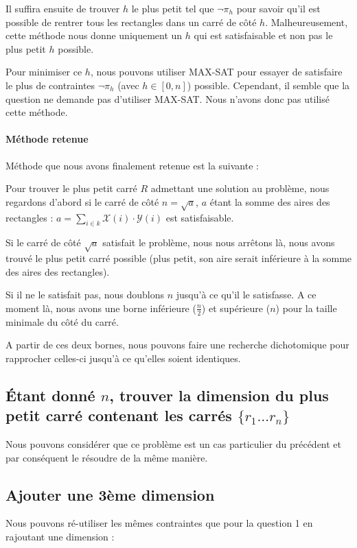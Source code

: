 \documentclass[a4paper]{article}
\begin{document}
Il suffira ensuite de trouver $h$ le plus petit tel que $\lnot \pi_{h}$ pour savoir qu'il est possible de rentrer tous les rectangles dans un carré de côté $h$. Malheureusement, cette méthode nous donne uniquement un $h$ qui est satisfaisable et non pas le plus petit $h$ possible.

Pour minimiser ce $h$, nous pouvons utiliser MAX-SAT pour essayer de satisfaire le plus de contraintes $\lnot \pi_h$ (avec $h \in [0, n]$) possible. Cependant, il semble que la question ne demande pas d'utiliser MAX-SAT. Nous n'avons donc pas utilisé cette méthode.

\paragraph{Méthode retenue} Méthode que nous avons finalement retenue est la suivante :

Pour trouver le plus petit carré $R$ admettant une solution au problème, nous regardons d'abord si le carré de côté $n=\sqrt{a}$, $a$ étant la somme des aires des rectangles : $a = \sum_{i \in k} \mathcal{X}(i) \cdot \mathcal{Y}(i)$ est satisfaisable.

Si le carré de côté $\sqrt{a}$ satisfait le problème, nous nous arrêtons là, nous avons trouvé le plus petit carré possible (plus petit, son aire serait inférieure à la somme des aires des rectangles).

Si il ne le satisfait pas, nous doublons $n$ jusqu'à ce qu'il le satisfasse. A ce moment là, nous avons une borne inférieure ($\frac{n}{2}$) et supérieure ($n$) pour la taille minimale du côté du carré.

A partir de ces deux bornes, nous pouvons faire une recherche dichotomique pour rapprocher celles-ci jusqu'à ce qu'elles soient identiques.

\subsection{Étant donné $n$, trouver la dimension du plus petit carré contenant les carrés $\{r_1 \ldots r_n \}$}

Nous pouvons considérer que ce problème est un cas particulier du précédent et par conséquent le résoudre de la même manière.

\subsection{Ajouter une 3ème dimension}
Nous pouvons ré-utiliser les mêmes contraintes que pour la question 1 en rajoutant une dimension :
\end{document}
